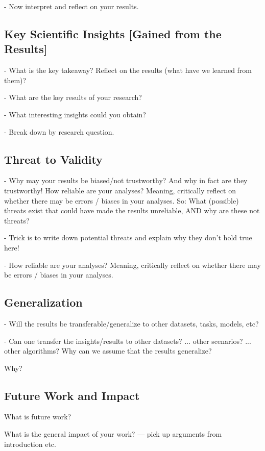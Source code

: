 \documentclass[manuscript, nonacm]{acmart}
\begin{document}
- Now interpret and reflect on your results.

\subsection{Key Scientific Insights [Gained from the Results]}
\label{sec:keyresults}

- What is the key takeaway? Reflect on the results (what have we learned from them)?

- What are the key results of your research?

- What interesting insights could you obtain?

- Break down by research question.

\subsection{Threat to Validity}
\label{sec:threattovalidity}

- Why may your results be biased/not trustworthy? And why in fact are they trustworthy! How reliable are your analyses? Meaning, critically reflect on whether there may be errors / biases in your analyses. So: What (possible) threats exist that could have made the results unreliable, AND why are these not threats?

- Trick is to write down potential threats and explain why they don't hold true here!

- How reliable are your analyses? Meaning, critically reflect on whether there may be errors / biases in your analyses.

\subsection{Generalization}
\label{sec:generalization}

- Will the results be transferable/generalize to other datasets, tasks, models, etc?

- Can one transfer the insights/results to other datasets? ... other scenarios? ... other algorithms? Why can we assume that the results generalize?

Why?

\subsection{Future Work and Impact}
\label{sec:futurework}

What is future work?

What is the general impact of your work?
--- pick up arguments from introduction etc.
\end{document}
